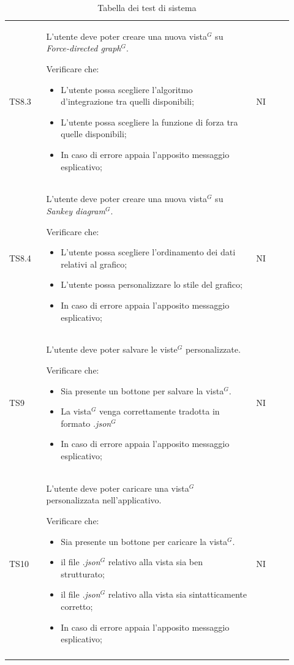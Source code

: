 \begin{longtable}{p{0.12\linewidth}p{0.68\linewidth}p{0.12\linewidth}}
    \rowcolor[RGB]{233, 245, 206}
    TS8.3 &
    L'utente deve poter creare una nuova vista$^{G}$ su \textit{Force-directed graph}$^{G}$. \par
    Verificare che:
    \begin{itemize}
        \item L'utente possa scegliere l'algoritmo d'integrazione tra quelli disponibili;
        \item L'utente possa scegliere la funzione di forza tra quelle disponibili;
        \item In caso di errore appaia l’apposito messaggio esplicativo;
    \end{itemize}&
    NI \\

    \rowcolor[RGB]{216, 235, 171}
    TS8.4 &
    L'utente deve poter creare una nuova vista$^{G}$ su \textit{Sankey diagram}$^{G}$. \par
    Verificare che:
    \begin{itemize}
        \item L'utente possa scegliere l'ordinamento dei dati relativi al grafico;
        \item L'utente possa personalizzare lo stile del grafico;
        \item In caso di errore appaia l'apposito messaggio esplicativo;
    \end{itemize}&
    NI \\

    \rowcolor[RGB]{233, 245, 206}
    TS9 &
    L'utente deve poter salvare le viste$^{G}$ personalizzate. \par
    Verificare che:
    \begin{itemize}
        \item Sia presente un bottone per salvare la vista$^{G}$.
        \item La vista$^{G}$ venga correttamente tradotta in formato \textit{.json}$^{G}$
        \item In caso di errore appaia l'apposito messaggio esplicativo;
    \end{itemize}&
    NI \\

    \rowcolor[RGB]{216, 235, 171}
    TS10 &
    L'utente deve poter caricare una vista$^{G}$ personalizzata nell'applicativo. \par
    Verificare che:
    \begin{itemize}
        \item Sia presente un bottone per caricare la vista$^{G}$.
        \item il file \textit{.json}$^{G}$ relativo alla vista sia ben strutturato;
        \item il file \textit{.json}$^{G}$ relativo alla vista sia sintatticamente corretto;
        \item In caso di errore appaia l'apposito messaggio esplicativo;
    \end{itemize}&
    NI \\
    
    \caption{Tabella dei test di sistema}
\end{longtable}	 

